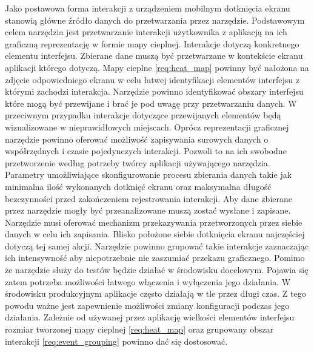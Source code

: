 \begin{enumerate}[label=\textbf{F.\arabic*}]
	 Jako postawowa forma interakcji z urządzeniem mobilnym dotknięcia ekranu stanowią główne źródło danych do przetwarzania przez narzędzie.
	 Podstawowym celem narzędzia jest przetwarzanie interakcji użytkownika z aplikacją na ich graficzną reprezentację w formie mapy cieplnej. 
	 Interakcje dotyczą konkretnego elementu interfejsu. Zbierane dane muszą być przetwarzane w kontekście ekranu aplikacji którego dotyczą. Mapy cieplne \ref{req:heat_map} powinny być nałożona na zdjęcie odpowiedniego ekranu w celu łatwej identyfikacji elementów interfejsu z którymi zachodzi interakcja.
	 Narzędzie powinno identyfikować obszary interfejsu które mogą być przewijane i brać je pod uwagę przy przetwarzaniu danych. W przeciwnym przypadku interakcje dotyczące przewijanych elementów będą wizualizowane w nieprawidłowych miejscach.
	 Oprócz reprezentacji graficznej narzędzie powinno oferować możliwość zapisywania surowych danych o współrzędnych i czasie pojedynczych interakcji. Pozwoli to na ich swobodne przetworzenie według potrzeby twórcy aplikacji używającego narzędzia.
	 Parametry umożliwiające skonfigurowanie procesu zbierania danych takie jak minimalna ilość wykonanych dotknięć ekranu oraz maksymalna długość bezczynności przed zakończeniem rejestrowania interakcji.
	 Aby dane zbierane przez narzędzie mogły być przeanalizowane muszą zostać wysłane i zapisane. Narzędzie musi oferować mechanizm przekazywania przetworzonych przez siebie danych w celu ich zapisania.
	 Blisko położone siebie dotknięcia ekranu najczęściej dotyczą tej samej akcji. Narzędzie powinno grupować takie interakcje zaznaczając ich intensywność aby niepotrzebnie nie zaszumiać przekazu graficznego.
	 Pomimo że narzędzie służy do testów będzie działać w środowisku docelowym. Pojawia się zatem potrzeba możliwości łatwego włączenia i wyłączenia jego działania.
	 W środowisku produkcyjnym aplikacje często działają w tle przez długi czas. Z tego powodu ważne jest zapewnienie możliwości zmiany konfiguracji podczas jego działania.
	 Zależnie od używanej przez aplikację wielkości elementów interfejsu rozmiar tworzonej mapy cieplnej \ref{req:heat_map} oraz grupowany obszar interakcji \ref{req:event_grouping} powinno dać się dostosować. 
\end{enumerate}
